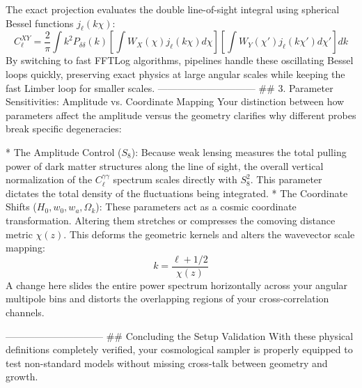 The exact projection evaluates the double line-of-sight integral using spherical Bessel functions $j_\ell(k\chi)$:
$$C_\ell^{XY} = \frac{2}{\pi} \int k^2 P_{\delta\delta}(k) \left[ \int W_X(\chi) j_\ell(k\chi) d\chi \right] \left[ \int W_Y(\chi') j_\ell(k\chi') d\chi' \right] dk$$ 
By switching to fast FFTLog algorithms, pipelines handle these oscillating Bessel loops quickly, preserving exact physics at large angular scales while keeping the fast Limber loop for smaller scales.
------------------------------
## 3. Parameter Sensitivities: Amplitude vs. Coordinate Mapping
Your distinction between how parameters affect the amplitude versus the geometry clarifies why different probes break specific degeneracies:

* The Amplitude Control ($S_8$): Because weak lensing measures the total pulling power of dark matter structures along the line of sight, the overall vertical normalization of the $C_\ell^{\gamma\gamma}$ spectrum scales directly with $S_8^2$. This parameter dictates the total density of the fluctuations being integrated.
* The Coordinate Shifts ($H_0, w_0, w_a, \Omega_k$): These parameters act as a cosmic coordinate transformation. Altering them stretches or compresses the comoving distance metric $\chi(z)$. This deforms the geometric kernels and alters the wavevector scale mapping:
$$k = \frac{\ell + 1/2}{\chi(z)}$$ 
A change here slides the entire power spectrum horizontally across your angular multipole bins and distorts the overlapping regions of your cross-correlation channels.

------------------------------
## Concluding the Setup Validation
With these physical definitions completely verified, your cosmological sampler is properly equipped to test non-standard models without missing cross-talk between geometry and growth.
